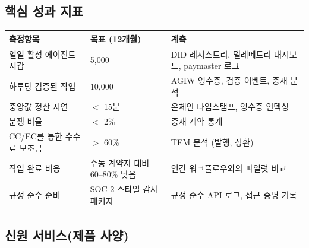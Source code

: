 \documentclass[11pt]{article}
\begin{document}
\subsection{핵심 성과 지표}
\begin{longtable}{@{}p{}p{}p{}@{}}
\toprule
\textbf{측정항목} & \textbf{목표 (12개월)} & \textbf{계측} \\\midrule
일일 활성 에이전트 지갑 & 5,000 & DID 레지스트리, 텔레메트리 대시보드, paymaster 로그 \\
하루당 검증된 작업 & 10,000 & AGIW 영수증, 검증 이벤트, 중재 분석 \\
중앙값 정산 지연 & $<$ 15분 & 온체인 타임스탬프, 영수증 인덱싱 \\
분쟁 비율 & $<$ 2\% & 중재 계약 통계 \\
CC/EC를 통한 수수료 보조금 & $>$ 60\% & TEM 분석 (발행, 상환) \\
작업 완료 비용 & 수동 계약자 대비 60--80\% 낮음 & 인간 워크플로우와의 파일럿 비교 \\
규정 준수 준비 & SOC 2 스타일 감사 패키지 & 규정 준수 API 로그, 접근 증명 기록 \\
\bottomrule
\end{longtable}

\subsection{신원 서비스(제품 사양)}
\label{sec:identity-spec}
\end{document}
